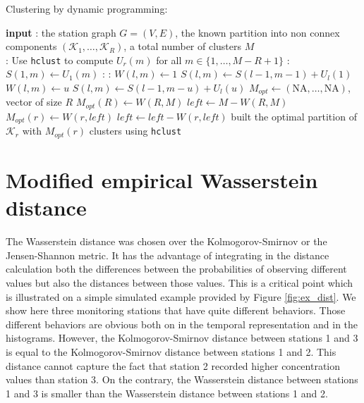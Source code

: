 \begin{appendices}
\begin{algorithm}[ht]
\begin{algorithmic}
\end{algorithmic}
\end{algorithm} 

\begin{algorithm}[ht]
\caption{Clustering by dynamic programming:}\label{algo:dyn}
\begin{algorithmic}

\State \textbf{input} : the station graph $G=(V,E)$, the known partition into non connex components $(\mathcal{K}_1,\dots,\mathcal{K}_R)$, a total number of clusters $M$ \\
    
  : 
 \State Use \texttt{hclust} to compute $U_r(m)$ for all $m \in \{1,\dots,M-R+1\}$
 \EndFor 
  : 
 \State $S(1,m) \gets U_1(m)$ 
 \EndFor 
  : 
   : 
     \State $W(l,m) \gets 1$ 
     \State $S(l,m) \gets S(l-1,m-1)+U_l(1)$
     \State $W(l,m) \gets u$
     \State $S(l,m) \gets S(l-1,m-u)+U_l(u)$
   \EndIf
   \EndFor
 \EndFor 
 \EndFor 
 \State $M_{opt} \gets (\text{NA},\dots,\text{NA})$, vector of size $R$
 \State $M_{opt}(R) \gets W(R,M)$
 \State $\textit{left} \gets M-W(R,M)$
 \State $M_{opt}(r) \gets W(r,\textit{left})$
 \State $\textit{left} \gets \textit{left}-W(r,\textit{left})$
 \EndFor
 \State built the optimal partition of $\mathcal{K}_r$ with $M_{opt}(r)$ clusters using \texttt{hclust}
 \EndFor 
\end{algorithmic}
\end{algorithm} 

\clearpage

\section{Modified empirical Wasserstein distance}\label{appendix:wasserstein}

The Wasserstein distance was chosen over the Kolmogorov-Smirnov or the Jensen-Shannon metric. It has the advantage of integrating in the distance calculation both the differences between the probabilities of observing different values but also the distances between those values. This is a critical point which is illustrated on a simple simulated example provided by Figure \ref{fig:ex_dist}. We show here three monitoring stations that have quite different behaviors. Those different behaviors are obvious both on in the temporal representation and in the histograms. However, the Kolmogorov-Smirnov distance between stations 1 and 3 is equal to the Kolmogorov-Smirnov distance between stations 1 and 2. This distance cannot capture the fact that station 2 recorded higher concentration values than station 3. On the contrary, the Wasserstein distance between stations 1 and 3 is smaller than the Wasserstein distance between stations 1 and 2. 


\end{appendices}
